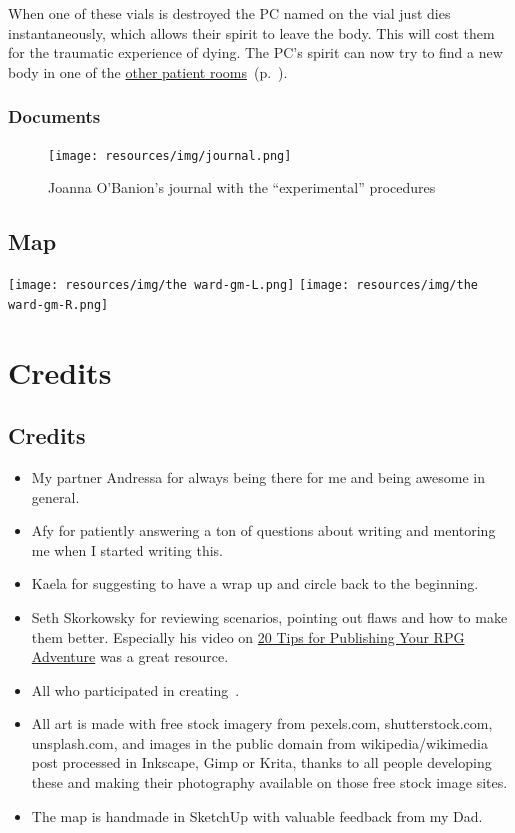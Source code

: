 \documentclass[bg-full]{resources/stylesheets/kult}
\begin{document}
When one of these vials is destroyed the PC named on the vial just dies instantaneously, which allows their spirit to leave the
body.  This will cost them  for the traumatic experience of dying.  The PC's spirit can now try to find a new
body in one of the \hyperref[ssub:other_patient_rooms]{other patient rooms}~(p.~\pageref{ssub:other_patient_rooms}).

\subsubsection{Documents}%
\label{ssub:documents}

\begin{figure}[!htbp]
  \centering
  \texttt{[image: resources/img/journal.png]}
  \caption{Joanna O'Banion's journal with the “experimental” procedures}\label{notebook}
\end{figure}

\clearpage %
\onecolumn
\subsection{Map}%
\label{sub:map}
\hspace*{-0.5cm}%
\texttt{[image: resources/img/the ward-gm-L.png]}
\newpage
\vspace*{0.55cm}%
\hspace*{-2.0cm}%
\texttt{[image: resources/img/the ward-gm-R.png]}
\section{Credits}%
\label{sec:credits}

\subsection*{Credits}

\begin{itemize}[noitemsep]
  \item My partner Andressa for always being there for me and being awesome in general.
  \item Afy for patiently answering a ton of questions about writing and mentoring me when I started writing this.
  \item Kaela for suggesting to have a wrap up and circle back to the beginning.
  \item Seth Skorkowsky for reviewing scenarios, pointing out flaws and how to make them better.  Especially his video on
        \href{https://www.youtube.com/watch?v=MGxO88C5WFI}{20 Tips for Publishing Your RPG Adventure} was a great resource.
  \item All who participated in creating~\cite{KULT:tex}.
  \item All art is made with free stock imagery from pexels.com, shutterstock.com, unsplash.com, and images in the public
        domain from wikipedia/wikimedia post processed in Inkscape, Gimp or Krita, thanks to all people developing these and
        making their photography available on those free stock image sites.
  \item The map is handmade in SketchUp with valuable feedback from my Dad.
\end{itemize}

\clearpage %
%
\printbibliography[title={Bibliography},heading=bibintoc]
\clearpage
\printindex
\end{document}
